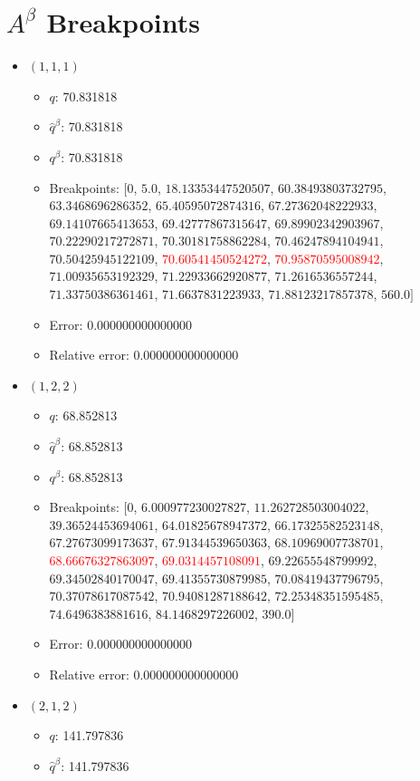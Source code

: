 \documentclass{article}%
\begin{document}
\section{$A^\beta$ Breakpoints}%
\thispagestyle{plain}%
\begin{itemize}%
	\item $(1, 1, 1)$%
	\begin{itemize}%
		\item $q$: 70.831818%
		\item $\hat{q}^\beta$: 70.831818%
		\item $q^\beta$: 70.831818%
		\item Breakpoints: $[$$0$, $5.0$, $18.13353447520507$, $60.38493803732795$, $63.3468696286352$, $65.40595072874316$, $67.27362048222933$, $69.14107665413653$, $69.42777867315647$, $69.89902342903967$, $70.22290217272871$, $70.30181758862284$, $70.46247894104941$, $70.50425945122109$, \textcolor{red}{$70.60541450524272$}, \textcolor{red}{$70.95870595008942$}, $71.00935653192329$, $71.22933662920877$, $71.2616536557244$, $71.33750386361461$, $71.6637831223933$, $71.88123217857378$, $560.0$$]$%
		\item Error: 0.000000000000000%
		\item Relative error: 0.000000000000000%
	\end{itemize}%
	\item $(1, 2, 2)$%
	\begin{itemize}%
		\item $q$: 68.852813%
		\item $\hat{q}^\beta$: 68.852813%
		\item $q^\beta$: 68.852813%
		\item Breakpoints: $[$$0$, $6.000977230027827$, $11.262728503004022$, $39.36524453694061$, $64.01825678947372$, $66.17325582523148$, $67.27673099173637$, $67.91344539650363$, $68.10969007738701$, \textcolor{red}{$68.66676327863097$}, \textcolor{red}{$69.0314457108091$}, $69.22655548799992$, $69.34502840170047$, $69.41355730879985$, $70.08419437796795$, $70.37078617087542$, $70.94081287188642$, $72.25348351595485$, $74.6496383881616$, $84.1468297226002$, $390.0$$]$%
		\item Error: 0.000000000000000%
		\item Relative error: 0.000000000000000%
	\end{itemize}%
	\item $(2, 1, 2)$%
	\begin{itemize}%
		\item $q$: 141.797836%
		\item $\hat{q}^\beta$: 141.797836%

\end{itemize}
\end{itemize}
\end{document}
